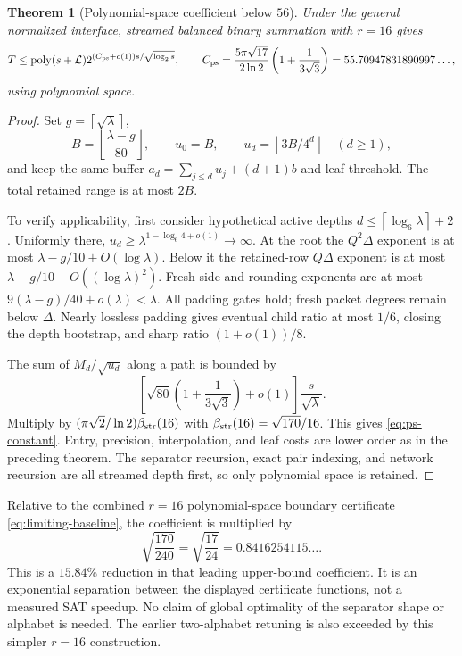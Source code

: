\documentclass[11pt]{article}
\newtheorem{theorem}{Theorem}[section]
\theoremstyle{definition}\newtheorem{definition}[theorem]{Definition}
\theoremstyle{remark}\newtheorem{remark}[theorem]{Remark}
\newcommand{\poly}{\operatorname{poly}}
\newcommand{\floor}[1]{\left\lfloor#1\right\rfloor}
\newcommand{\ceil}[1]{\left\lceil#1\right\rceil}
\begin{document}
\begin{theorem}[Polynomial-space coefficient below $56$]\label{thm:ps}
Under the general normalized interface, streamed balanced binary summation
with $r=16$ gives
\begin{equation}
 T\le\poly(s+\mathcal L)
 2^{(C_{\rm ps}+o(1))s/\sqrt{\log_2s}},\qquad
 C_{\rm ps}=\frac{5\pi\sqrt{17}}{2\ln2}
       \left(1+\frac1{3\sqrt3}\right)
 =55.70947831890997\ldots,
 \label{eq:ps-constant}
\end{equation}
using polynomial space.
\end{theorem}
\begin{proof}
Set $g=\ceil{\sqrt\lambda}$,
\[
 B=\floor{\frac{\lambda-g}{80}},\qquad
 u_0=B,\qquad u_d=\floor{3B/4^d}\quad(d\ge1),
\]
and keep the same buffer $a_d=\sum_{j\le d}u_j+(d+1)b$ and leaf threshold.
The total retained range is at most $2B$.

To verify applicability, first consider hypothetical active depths
$d\le\ceil{\log_6\lambda}+2$. Uniformly there,
$u_d\ge\lambda^{1-\log_6 4+o(1)}\to\infty$.
At the root the $Q^2\Delta$ exponent is at most
$\lambda-g/10+O(\log\lambda)$. Below it the retained-row $Q\Delta$
exponent is at most $\lambda-g/10+O((\log\lambda)^2)$.
Fresh-side and rounding exponents are at most
$9(\lambda-g)/40+o(\lambda)<\lambda$. All padding gates hold; fresh
packet degrees remain below $\Delta$. Nearly lossless padding gives eventual
child ratio at most $1/6$, closing the depth bootstrap, and sharp ratio
$(1+o(1))/8$.

The sum of $M_d/\sqrt{u_d}$ along a path is bounded by
\[
 \left[\sqrt{80}\left(1+\frac1{3\sqrt3}\right)+o(1)\right]
 \frac{s}{\sqrt\lambda}.
\]
Multiply by $(\pi\sqrt2/\ln2)\beta_{\rm str}(16)$ with
$\beta_{\rm str}(16)=\sqrt{170}/16$. This gives
\eqref{eq:ps-constant}. Entry, precision, interpolation, and leaf costs
are lower order as in the preceding theorem. The separator recursion,
exact pair indexing, and network recursion are all streamed depth first,
so only polynomial space is retained.
\end{proof}

Relative to the combined $r=16$ polynomial-space boundary
certificate \eqref{eq:limiting-baseline}, the coefficient is multiplied by
\[
 \sqrt{\frac{170}{240}}=\sqrt{\frac{17}{24}}
 =0.8416254115\ldots.
\]
This is a $15.84\%$ reduction in that leading upper-bound coefficient. It
is an exponential separation between the displayed certificate functions,
not a measured SAT speedup. No claim of global optimality of the separator
shape or alphabet is needed. The earlier two-alphabet retuning is also
exceeded by this simpler $r=16$ construction.
\end{document}
